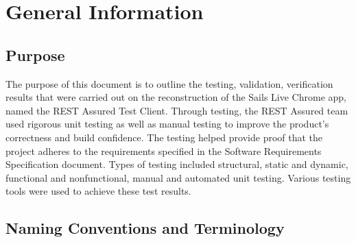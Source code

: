 \documentclass[12pt, titlepage]{article}
\begin{document}
\section{General Information}
	
\subsection{Purpose}
The purpose of this document is to outline the testing, validation, verification results that were carried out on the reconstruction of the Sails Live Chrome app, named the REST Assured Test Client. Through testing, the REST Assured team used rigorous unit testing as well as manual testing to improve the product’s correctness and build confidence. The testing helped provide proof that the project adheres to the requirements specified in the Software Requirements Specification document. 
Types of testing included structural, static and dynamic, functional and nonfunctional, manual and automated unit testing. Various testing tools were used to achieve these test results.


\subsection{Naming Conventions and Terminology}
\end{document}
